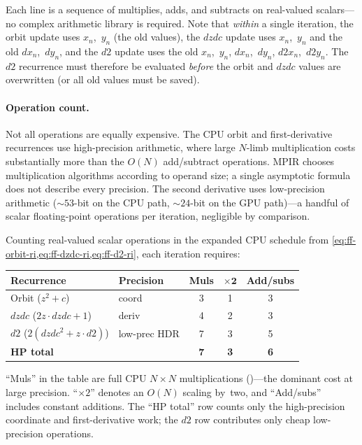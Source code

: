 \noindent
Each line is a sequence of multiplies, adds, and subtracts on real-valued
scalars---no complex arithmetic library is required.  Note that
\emph{within} a single iteration, the orbit update uses $x_n$,~$y_n$ (the
old values), the $\mathit{dzdc}$ update uses $x_n$,~$y_n$ and the old
$dx_n$,~$dy_n$, and the $d2$ update uses the old $x_n$,~$y_n$,
$dx_n$,~$dy_n$, $d2x_n$,~$d2y_n$.  The $d2$ recurrence must therefore be
evaluated \emph{before} the orbit and $\mathit{dzdc}$ values are
overwritten (or all old values must be saved).

\paragraph{Operation count.}
Not all operations are equally expensive.  The CPU orbit and first-derivative
recurrences use high-precision  arithmetic, where large
$N$-limb multiplication costs substantially more than the $O(N)$
add/subtract operations.  MPIR chooses multiplication algorithms according
to operand size; a single asymptotic formula does not describe every precision.
The second derivative uses low-precision
 arithmetic (${\sim}53$-bit on the CPU path,
${\sim}24$-bit on the GPU path)---a handful of scalar floating-point
operations per iteration, negligible by comparison.

Counting real-valued scalar operations in the expanded CPU schedule from
\cref{eq:ff-orbit-ri,eq:ff-dzdc-ri,eq:ff-d2-ri}, each iteration requires:

\begin{center}
\small
\begin{tabular}{llccc}
\hline
\textbf{Recurrence} & \textbf{Precision} &
  \textbf{Muls} & $\boldsymbol{\times 2}$ & \textbf{Add/subs} \\
\hline
Orbit ($z^2 + c$) & coord &
  3 & 1 & 3 \\
$\mathit{dzdc}$ ($2z \cdot \mathit{dzdc} + 1$) & deriv &
  4 & 2 & 3 \\
$d2$ ($2(\mathit{dzdc}^2 {+} z {\cdot} d2)$) & low-prec HDR &
  7 & 3 & 5 \\
\hline
\textbf{HP total} & &
  \textbf{7} & \textbf{3} & \textbf{6} \\
\hline
\end{tabular}
\end{center}

\noindent
``Muls'' in the table are full CPU $N \times N$ multiplications
()---the dominant cost at large precision.
``$\times 2$'' denotes an $O(N)$ scaling by~two, and ``Add/subs'' includes
constant additions.  The ``HP total'' row counts only the high-precision
coordinate and first-derivative work; the $d2$ row contributes only cheap
low-precision operations.

